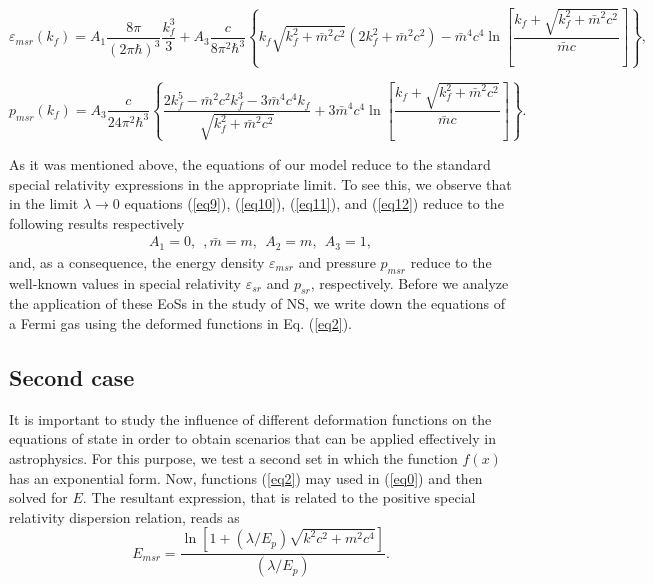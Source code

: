 \documentclass[final,5p,times,twocolumn]{elsarticle}
\begin{document}
\begin{widetext}
\begin{equation}
     \varepsilon_{msr}(k_f)= A_1 \frac{8 \pi}{(2 \pi \hbar)^3} \frac{k_f^3}{3} +A_3 \frac{c}{8 \pi^2 \hbar^3} \left\{ k_f \sqrt{k_f^2 + \bar{m}^2 c^2} \left( 2 k_f^2 + \bar{m}^2 c^2 \right) - \bar{m}^4 c^4 \ln \left[ \frac{k_f + \sqrt{k_f^2 + \bar{m}^2 c^2}}{\bar{m} c} \right] \right\},
     \label{eq13}
\end{equation}

\begin{equation}
     p_{msr}(k_f)= A_3 \frac{c}{24 \pi^2 \hbar^3} \left\{ \frac{2 k_f^5 - \bar{m}^2 c^2 k_f^3 -3 \bar{m}^4 c^4 k_f}{\sqrt{k_f^2 + \bar{m}^2 c^2}} + 3 \bar{m}^4 c^4 \ln \left[ \frac{k_f + \sqrt{k_f^2 + \bar{m}^2 c^2}}{\bar{m} c} \right] \right\}
     \label{eq14}.
\end{equation}
\end{widetext}
As it was mentioned above, the equations of our model reduce to the standard special relativity expressions in the appropriate limit. To see this, we observe that in the limit $\lambda \rightarrow 0$ equations (\ref{eq9}), (\ref{eq10}), (\ref{eq11}), and (\ref{eq12}) reduce to the following results respectively
\begin{align}
    A_1=0,\:\:,\bar{m}=m, \:\: A_2=m,\:\:A_3=1,
     \label{eq15}
\end{align}
and, as a consequence, the energy density $\varepsilon_{msr}$ and pressure $p_{msr}$ reduce to the well-known values  in special relativity  $\varepsilon_{sr}$ and $p_{sr}$, respectively. 
Before we analyze the application of these EoSs in the study of NS, we write down the equations of a Fermi gas using the deformed functions in Eq. (\ref{eq2}).  


\subsection{Second case}
It is important to study the influence of different deformation functions on the equations of state in order to obtain scenarios that can be applied effectively in astrophysics. For this purpose, we test a second set in which the function $f(x)$ has an exponential form. Now, functions (\ref{eq2}) may used in (\ref{eq0}) and then solved for $E$. The resultant expression, that is related to the positive special relativity dispersion relation, reads as  
\begin{equation}
    E_{msr}=\frac{\ln \left[ 1 + (\lambda/E_p) \sqrt{k^2 c^2 + m^2 c^4} \right]}{(\lambda/E_p)}. 
    \label{eq16}
\end{equation}
\end{document}
